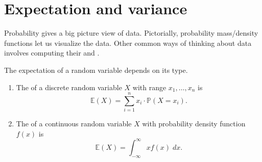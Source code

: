 \documentclass[../main.tex]{subfiles}
\begin{document}
 \section{Expectation and variance}

Probability gives a big picture view of data. Pictorially, probability mass/density functions let us visualize the data. Other common ways of thinking about data involves computing their  and . 

\begin{definition}[expectation]
  The expectation of a random variable depends on its type.

  \begin{enumerate}
    \item The  of a discrete random variable \(X\) with range \(x_{1},\ldots,x_{n}\) is
      \[
        \mathbb{E}(X) = \sum_{i = 1}^{n} x_{i} \cdot \mathbb{P}(X = x_{i}).
      \]

    \item The  of a continuous random variable \(X\) with probability density function \(f(x)\) is
      \[
        \mathbb{E}(X) = \int_{-\infty}^{\infty} x f(x) \;dx.
      \]
  \end{enumerate}
\end{definition}
\end{document}
